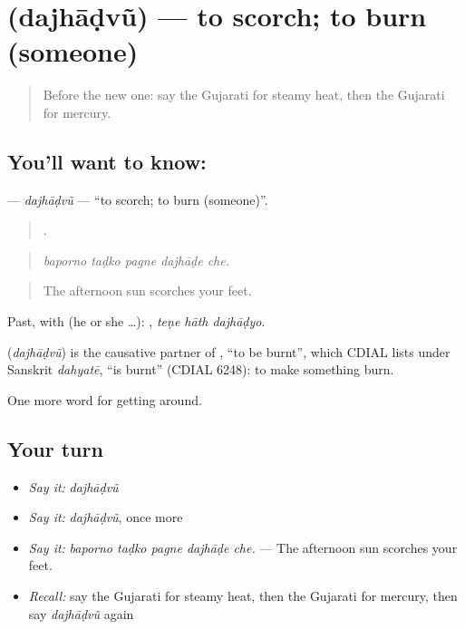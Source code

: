 \section[\texorpdfstring{\gu{દઝાડવું} (dajhāḍvũ)}{દઝાડવું (dajhāḍvũ)}]{ (dajhāḍvũ) — to scorch; to burn (someone)}

\label{lesson:GU-C436-dajhadvu}



\begin{quote}
Before the new one: say the Gujarati for steamy heat, then the Gujarati for mercury.
\end{quote}

\subsection*{You'll want to know: }
\textbf{} — \emph{dajhāḍvũ} — \textquotedblleft{}to scorch; to burn (someone)\textquotedblright{}.

\begin{quote}
    .
\end{quote}

\begin{quote}
\emph{baporno taḍko pagne dajhāḍe che.}
\end{quote}

\begin{quote}
The afternoon sun scorches your feet.
\end{quote}

Past, with  (he or she …):   , \emph{teṇe hāth dajhāḍyo}.

\begin{cousinweb}
\textbf{} (\emph{dajhāḍvũ}) is the causative partner of , \textquotedblleft{}to be burnt\textquotedblright{}, which CDIAL lists under Sanskrit \emph{dahyatē}, \textquotedblleft{}is burnt\textquotedblright{} (CDIAL 6248): to make something burn.
\end{cousinweb}

\begin{grammarlens}[title={What you've built}]
One more word for getting around.
\end{grammarlens}

\subsection*{Your turn}
\begin{itemize}
\raggedright
  \item \emph{Say it:} \emph{dajhāḍvũ}
  \item \emph{Say it:} \emph{dajhāḍvũ}, once more
  \item \emph{Say it:} \emph{baporno taḍko pagne dajhāḍe che.} — The afternoon sun scorches your feet.
  \item \emph{Recall:} say the Gujarati for steamy heat, then the Gujarati for mercury, then say \emph{dajhāḍvũ} again
\end{itemize}

